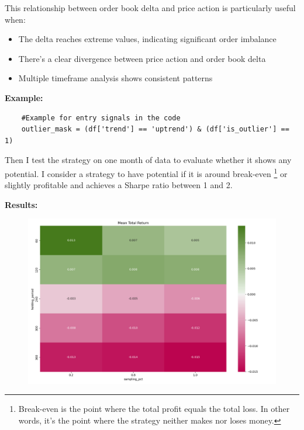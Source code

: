 \documentclass[12pt]{article}
\begin{document}
This relationship between order book delta and price action is particularly useful when:
\begin{itemize}
    \item The delta reaches extreme values, indicating significant order imbalance
    \item There's a clear divergence between price action and order book delta
    \item Multiple timeframe analysis shows consistent patterns
\end{itemize}




\newpage
\textbf{Example:}

\begin{verbatim}
    #Example for entry signals in the code
    outlier_mask = (df['trend'] == 'uptrend') & (df['is_outlier'] == 1)
\end{verbatim}

Then I test the strategy on one month of data to evaluate whether it shows any potential. I consider a strategy to have potential if it is around break-even \footnote{Break-even is the point where the total profit equals the total loss. In other words, it's the point where the strategy neither makes nor loses money.} or slightly profitable and achieves a Sharpe ratio between 1 and 2.

\textbf{Results:}

\begin{figure}[H]
    \centering
    \includegraphics[width=\textwidth,height=0.7\textheight,keepaspectratio]{imgs/showcase_market_simulation.png}
    \label{fig:bullish_outliers_comparison}
\end{figure}
\end{document}
